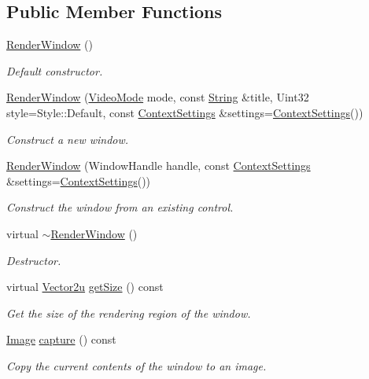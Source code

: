 \subsection*{Public Member Functions}
\begin{DoxyCompactItemize}
\item 
\hyperlink{classsf_1_1RenderWindow_a839bbf336bdcafb084dafc3076fc9021}{Render\-Window} ()
\begin{DoxyCompactList}\small\item\em Default constructor. \end{DoxyCompactList}\item 
\hyperlink{classsf_1_1RenderWindow_aebef983e01f677bf5a66cefc4d547647}{Render\-Window} (\hyperlink{classsf_1_1VideoMode}{Video\-Mode} mode, const \hyperlink{classsf_1_1String}{String} \&title, Uint32 style=Style\-::\-Default, const \hyperlink{structsf_1_1ContextSettings}{Context\-Settings} \&settings=\hyperlink{structsf_1_1ContextSettings}{Context\-Settings}())
\begin{DoxyCompactList}\small\item\em Construct a new window. \end{DoxyCompactList}\item 
\hyperlink{classsf_1_1RenderWindow_a25c0af7d515e710b6eebc9c6be952aa5}{Render\-Window} (Window\-Handle handle, const \hyperlink{structsf_1_1ContextSettings}{Context\-Settings} \&settings=\hyperlink{structsf_1_1ContextSettings}{Context\-Settings}())
\begin{DoxyCompactList}\small\item\em Construct the window from an existing control. \end{DoxyCompactList}\item 
virtual \hyperlink{classsf_1_1RenderWindow_a3407e36bfc1752d723140438a825365c}{$\sim$\-Render\-Window} ()
\begin{DoxyCompactList}\small\item\em Destructor. \end{DoxyCompactList}\item 
virtual \hyperlink{classsf_1_1Vector2}{Vector2u} \hyperlink{classsf_1_1RenderWindow_a2c7ff414be32621a453745cf2a0f8a3e}{get\-Size} () const 
\begin{DoxyCompactList}\small\item\em Get the size of the rendering region of the window. \end{DoxyCompactList}\item 
\hyperlink{classsf_1_1Image}{Image} \hyperlink{classsf_1_1RenderWindow_a9bd8655d0bac83145bfc329ea7a6d538}{capture} () const 
\begin{DoxyCompactList}\small\item\em Copy the current contents of the window to an image. \end{DoxyCompactList}\end{DoxyCompactItemize}

